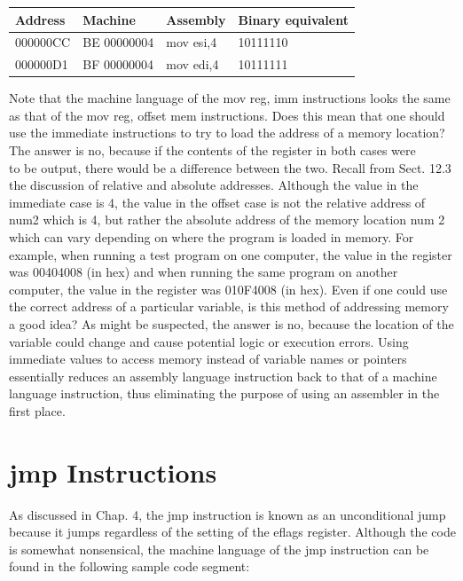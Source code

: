 \documentclass[10pt]{book}
\begin{document}
\begin{center}
\begin{tabular}{|l|l|l|l|}
\hline
Address & Machine & Assembly & Binary equivalent \\
\hline
000000CC & BE 00000004 & mov esi,4 & 10111110 \\
\hline
000000D1 & BF 00000004 & mov edi,4 & 10111111 \\
\hline
\end{tabular}
\end{center}

Note that the machine language of the mov reg, imm instructions looks the same as that of the mov reg, offset mem instructions. Does this mean that one should use the immediate instructions to try to load the address of a memory location? The answer is no, because if the contents of the register in both cases were\\
to be output, there would be a difference between the two. Recall from Sect. 12.3 the discussion of relative and absolute addresses. Although the value in the immediate case is 4, the value in the offset case is not the relative address of num2 which is 4, but rather the absolute address of the memory location num 2 which can vary depending on where the program is loaded in memory. For example, when running a test program on one computer, the value in the register was 00404008 (in hex) and when running the same program on another computer, the value in the register was 010F4008 (in hex).
Even if one could use the correct address of a particular variable, is this method of addressing memory a good idea? As might be suspected, the answer is no, because the location of the variable could change and cause potential logic or execution errors. Using immediate values to access memory instead of variable names or pointers essentially reduces an assembly language instruction back to that of a machine language instruction, thus eliminating the purpose of using an assembler in the first place.

\section{jmp Instructions}
As discussed in Chap. 4, the jmp instruction is known as an unconditional jump because it jumps regardless of the setting of the eflags register. Although the code is somewhat nonsensical, the machine language of the jmp instruction can be found in the following sample code segment:
\end{document}
